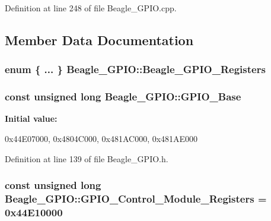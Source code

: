 \-Definition at line 248 of file \-Beagle\-\_\-\-G\-P\-I\-O.\-cpp.



\subsection{\-Member \-Data \-Documentation}
\hypertarget{class_beagle___g_p_i_o_a0164dbfd9376ef3a1e0a404d5cf2f431}{
\subsubsection[{\-Beagle\-\_\-\-G\-P\-I\-O\-\_\-\-Registers}]{\setlength{\rightskip}{0pt plus 5cm}enum \{ ... \}   {\bf \-Beagle\-\_\-\-G\-P\-I\-O\-::\-Beagle\-\_\-\-G\-P\-I\-O\-\_\-\-Registers}}}\label{class_beagle___g_p_i_o_a0164dbfd9376ef3a1e0a404d5cf2f431}
\hypertarget{class_beagle___g_p_i_o_ab259232b938bf1892836737c07610384}{
\subsubsection[{\-G\-P\-I\-O\-\_\-\-Base}]{\setlength{\rightskip}{0pt plus 5cm}const unsigned long {\bf \-Beagle\-\_\-\-G\-P\-I\-O\-::\-G\-P\-I\-O\-\_\-\-Base}}}\label{class_beagle___g_p_i_o_ab259232b938bf1892836737c07610384}
{\bfseries \-Initial value\-:}
\begin{DoxyCode}
 
{
        0x44E07000,     
        0x4804C000,     
        0x481AC000,     
        0x481AE000      
}
\end{DoxyCode}


\-Definition at line 139 of file \-Beagle\-\_\-\-G\-P\-I\-O.\-h.

\hypertarget{class_beagle___g_p_i_o_a45dea13988842b47f592806fd15f1262}{
\subsubsection[{\-G\-P\-I\-O\-\_\-\-Control\-\_\-\-Module\-\_\-\-Registers}]{\setlength{\rightskip}{0pt plus 5cm}const unsigned long {\bf \-Beagle\-\_\-\-G\-P\-I\-O\-::\-G\-P\-I\-O\-\_\-\-Control\-\_\-\-Module\-\_\-\-Registers} = 0x44\-E10000}}\label{class_beagle___g_p_i_o_a45dea13988842b47f592806fd15f1262}


